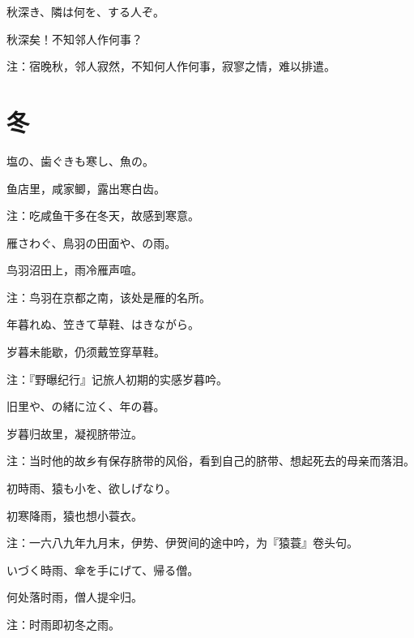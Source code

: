 \begin{haiku}
    {\FH 秋深き、隣は何を、する人ぞ。}

    {\FK 秋深矣！不知邻人作何事？}

    {\FT 注：宿晚秋，邻人寂然，不知何人作何事，寂寥之情，难以排遣。}
\end{haiku}

\section{\FK 冬}

\setcounter{haikucounter}{0}

\begin{haiku}
    {\FH 塩の、歯ぐきも寒し、魚の。}

    {\FK 鱼店里，咸家鲫，露出寒白齿。}

    {\FT 注：吃咸鱼干多在冬天，故感到寒意。}
\end{haiku}

\begin{haiku}
    {\FH 雁さわぐ、鳥羽の田面や、の雨。}

    {\FK 鸟羽沼田上，雨冷雁声喧。}

    {\FT 注：鸟羽在京都之南，该处是雁的名所。}
\end{haiku}

\begin{haiku}
    {\FH 年暮れぬ、笠きて草鞋、はきながら。}

    {\FK 岁暮未能歇，仍须戴笠穿草鞋。}

    {\FT 注：『野曝纪行』记旅人初期的实感岁暮吟。}
\end{haiku}

\begin{haiku}
    {\FH 旧里や、の緒に泣く、年の暮。}

    {\FK 岁暮归故里，凝视脐带泣。}

    {\FT 注：当时他的故乡有保存脐带的风俗，看到自己的脐带、想起死去的母亲而落泪。}
\end{haiku}

\begin{haiku}
    {\FH 初時雨、猿も小を、欲しげなり。}

    {\FK 初寒降雨，猿也想小蓑衣。}

    {\FT 注：一六八九年九月末，伊势、伊贺间的途中吟，为『猿蓑』卷头句。}
\end{haiku}

\begin{haiku}
    {\FH いづく時雨、傘を手にげて、帰る僧。}

    {\FK 何处落时雨，僧人提伞归。}

    {\FT 注：时雨即初冬之雨。}
\end{haiku}

